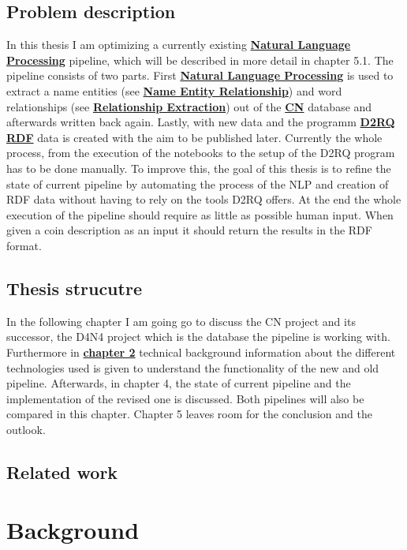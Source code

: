 \documentclass[12pt, oneside]{article}
\begin{document}
\subsection{Problem description} 
In this thesis I am optimizing a currently existing \hyperref[nlp]{\textbf{Natural Language Processing}} pipeline, which will be described in more detail in chapter 5.1. The pipeline consists of two parts. First \hyperref[nlp]{\textbf{Natural Language Processing}} is used to extract a name entities (see \hyperref[ner]{\textbf{Name Entity Relationship}}) and word relationships (see \hyperref[re]{\textbf{Relationship Extraction}}) out of the \hyperref[cn]{\textbf{CN}} database and afterwards written back again. Lastly, with new data and the programm \hyperref[d2r]{\textbf{D2RQ}} \hyperref[rdf]{\textbf{RDF}} data is created with the aim to be published later. Currently the whole process, from the execution of the notebooks to the setup of the D2RQ program has to be done manually. To improve this, the goal of this thesis is to refine the state of current pipeline by automating the process of the NLP and creation of RDF data without having to rely on the tools D2RQ offers. At the end the whole execution of the pipeline should require as little as possible human input. When  given a coin description as an input it should return the results in the RDF format.
\subsection{Thesis strucutre}
In the following chapter I am going go to discuss the CN project and its successor, the D4N4 project which is the database the pipeline is working with. Furthermore in \hyperref[bg]{\textbf{chapter 2}} technical background information about the different technologies used is given to understand the functionality of the new and old pipeline. Afterwards, in chapter 4, the state of current pipeline and the implementation of the revised one is discussed. Both pipelines will also be compared in this chapter. Chapter 5 leaves room for the conclusion and the outlook.
\newpage

\subsection{Related work}
\newpage

\section{Background}\label{bg}
\end{document}
